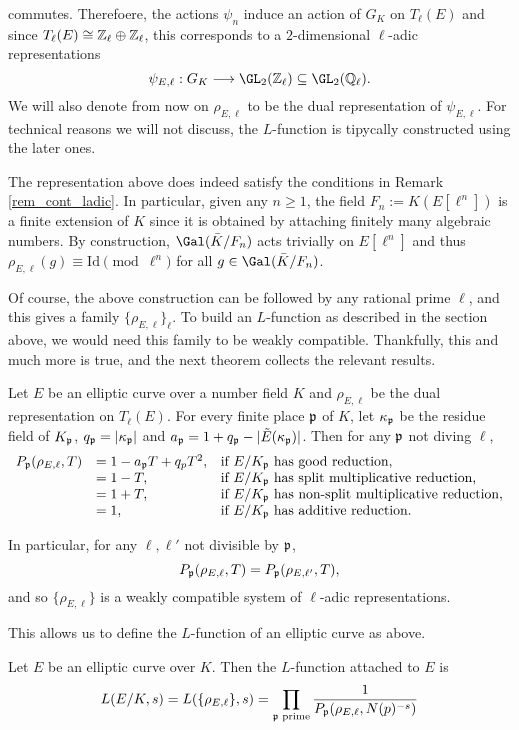 commutes. Therefoere, the actions $\psi_n$ induce an action of $G_K$ on $T_\ell(E)$ and since $T_\ell(E)\cong\mathbb{Z}_\ell\oplus\mathbb{Z}_\ell$, this corresponds to a $2$-dimensional $\ell$-adic representations
$$\psi_{E,\ell}:G_K\longrightarrow \GL_2(\ZZ_\ell)\subseteq\GL_2(\QQ_\ell).$$
We will also denote from now on $\rho_{E,\ell}$ to be the dual representation of $\psi_{E,\ell}$. For technical reasons we will not discuss, the $L$-function is tipycally constructed using the later ones.

\begin{rem}
    The representation above does indeed satisfy the conditions in Remark \ref{rem_cont_ladic}. In particular, given any $n\geq 1$, the field $F_n:=K(E[\ell^n])$ is a finite extension of $K$ since it is obtained by attaching finitely many algebraic numbers. By construction, $\Gal(\bar{K}/F_n)$ acts trivially on $E[\ell^n]$ and thus $\rho_{E,\ell}(g)\equiv \mathrm{Id}\pmod{\ell^n}$ for all $g\in\Gal(\bar{K}/F_n)$.
\end{rem}

Of course, the above construction can be followed by any rational prime $\ell$, and this gives a family $\{\rho_{E,\ell}\}_\ell$. To build an $L$-function as described in the section above, we would need this family to be weakly compatible. Thankfully, this and much more is true, and the next theorem collects the relevant results.

\begin{thm}
    Let $E$ be an elliptic curve over a number field $K$ and $\rho_{E,\ell}$ be the dual representation on $T_\ell(E)$. For every finite place $\mathfrak{p}$ of $K$, let $\kappa_{\mathfrak{p}}$ be the residue field of $K_{\mathfrak{p}}$, $q_{\mathfrak{p}}=|\kappa_{\mathfrak{p}}|$ and $a_{\mathfrak{p}}=1+q_{\mathfrak{p}}-|\tilde{E}(\kappa_{\mathfrak{p}})|$. Then for any $\mathfrak{p}$ not diving $\ell$,
    \[
        \begin{array}{l l l}
            P_{\mathfrak{p}}(\rho_{E,\ell},T)&= 1-a_{\mathfrak{p}} T+q_p T^2, & \text{if } E/K_{\mathfrak{p}} \text{ has good reduction,}\\
            & = 1-T, & \text{if } E/K_{\mathfrak{p}} \text{ has split multiplicative reduction,}\\
            & = 1+T, & \text{if } E/K_{\mathfrak{p}} \text{ has non-split multiplicative reduction,}\\
            & = 1, & \text{if } E/K_{\mathfrak{p}} \text{ has additive reduction.}
        \end{array}
    \]
    

    In particular, for any $\ell,\ell'$ not divisible by $\mathfrak{p}$, 
    $$P_{\mathfrak{p}}(\rho_{E,\ell},T)=P_{\mathfrak{p}}(\rho_{E,\ell'},T),$$
    and so $\{\rho_{E,\ell}\}$ is a weakly compatible system of $\ell$-adic representations.
\end{thm}

This allows us to define the $L$-function of an elliptic curve as above.

\begin{defn}
    Let $E$ be an elliptic curve over $K$. Then the $L$-function attached to $E$ is 
    $$L(E/K,s)=L(\{\rho_{E,\ell}\},s)=\prod_{\mathfrak{p}\text{ prime}}\frac{1}{P_{\mathfrak{p}}(\rho_{E,\ell},N(p)^{-s})}$$
\end{defn}
